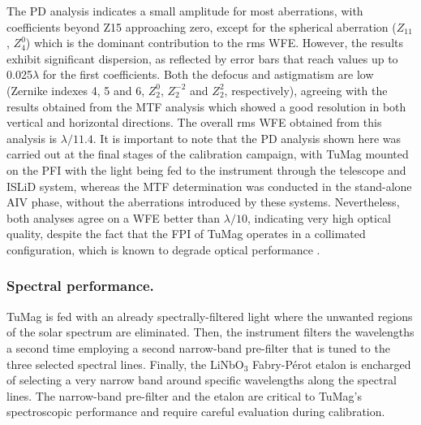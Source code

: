 The PD analysis indicates a small amplitude for most aberrations, with coefficients beyond Z15 approaching zero, except for the spherical aberration ($Z_{11}$, $Z_4 ^0$) which is the dominant contribution to the rms WFE. However, the results exhibit significant dispersion, as reflected by error bars that reach values up to 0.025$\lambda$ for the first coefficients. Both the defocus and astigmatism are low (Zernike indexes 4, 5 and 6, $Z _ 2 ^0$, $Z _ 2 ^{-2}$ and $Z _ 2 ^2$, respectively), agreeing with the results obtained from the MTF analysis which showed a good resolution in both vertical and horizontal directions. The overall rms WFE obtained from this analysis is $\lambda / 11.4$. It is important to note that the PD analysis shown here was carried out at the final stages of the calibration campaign, with TuMag mounted on the PFI with the light being fed to the instrument through the telescope and ISLiD system, whereas the MTF determination was conducted in the stand-alone AIV phase, without the aberrations introduced by these systems. Nevertheless, both analyses agree on a WFE better than $\lambda / 10$, indicating very high optical quality, despite the fact that the FPI of TuMag operates in a collimated configuration, which is known to degrade optical performance \citep{ghosts-etalon}.

\subsubsection{Spectral performance.}

TuMag is fed with an already spectrally-filtered light where the unwanted regions of the solar spectrum are eliminated.  Then, the instrument filters the wavelengths a second time employing a second narrow-band pre-filter that is tuned to the three selected spectral lines. Finally, the LiNbO$_3$ Fabry-Pérot etalon is encharged of selecting a very narrow band around specific wavelengths along the spectral lines. The narrow-band pre-filter and the etalon are critical to TuMag's spectroscopic performance and require careful evaluation during calibration.

